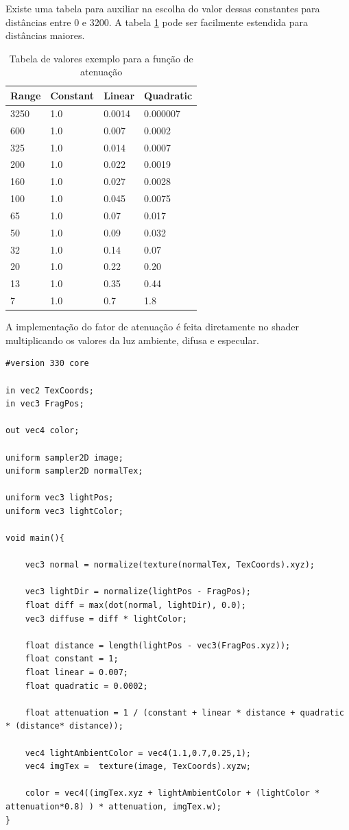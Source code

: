 \documentclass[12pt, 
openright, 
oneside, 
a4paper,    
brazil]{facom-ufu-abntex2}
\begin{document}
Existe uma tabela para auxiliar na escolha do valor dessas constantes para distâncias entre 0 e 3200. A tabela \ref{tab:attenuationValues} pode ser facilmente estendida para distâncias maiores.


\begin{table}[H]
\centering

\begin{tabular}{l l l l}
Range & Constant & Linear & Quadratic \\
\hline		
3250 & 1.0 & 0.0014 & 0.000007 \\
600 & 1.0 & 0.007 & 0.0002 \\
325 & 1.0 & 0.014 & 0.0007 \\
200 & 1.0 & 0.022 & 0.0019 \\
160 & 1.0 & 0.027 & 0.0028 \\
100 & 1.0 & 0.045 & 0.0075 \\
65 & 1.0 & 0.07 & 0.017 \\
50 & 1.0 & 0.09 & 0.032 \\
32 & 1.0 & 0.14 & 0.07 \\
20 & 1.0 & 0.22 & 0.20 \\
13 & 1.0 & 0.35 & 0.44 \\
7 & 1.0 & 0.7 & 1.8  \\

\end{tabular}
\caption{Tabela de valores exemplo para a função de atenuação}
\label{tab:attenuationValues}
\end{table}

A implementação do fator de atenuação é feita diretamente no shader multiplicando os valores da luz ambiente, difusa e especular.

\begin{lstlisting}[caption={Fragment Shader com luz ambiente, difusa e atenuação}]
#version 330 core

in vec2 TexCoords;
in vec3 FragPos;  

out vec4 color;

uniform sampler2D image;
uniform sampler2D normalTex;

uniform vec3 lightPos; 
uniform vec3 lightColor;

void main(){

	vec3 normal = normalize(texture(normalTex, TexCoords).xyz);

	vec3 lightDir = normalize(lightPos - FragPos);
	float diff = max(dot(normal, lightDir), 0.0);
	vec3 diffuse = diff * lightColor;
	
	float distance = length(lightPos - vec3(FragPos.xyz));
	float constant = 1;
	float linear = 0.007;
	float quadratic = 0.0002;
	
	float attenuation = 1 / (constant + linear * distance + quadratic * (distance* distance));
	
	vec4 lightAmbientColor = vec4(1.1,0.7,0.25,1);
	vec4 imgTex =  texture(image, TexCoords).xyzw;
	
	color = vec4((imgTex.xyz + lightAmbientColor + (lightColor * attenuation*0.8) ) * attenuation, imgTex.w);
}
\end{lstlisting}
\end{document}

